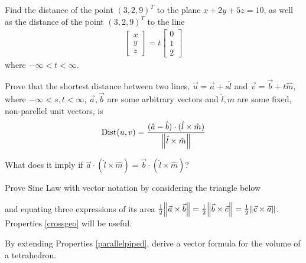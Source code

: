 \begin{Exercise}
Find the distance of the point $(3,2,9)^T$ to the plane $x + 2y + 5z = 10$, as well as the distance of the point $(3,2,9)^T$ to the line 
\begin{align*}
\begin{bmatrix}
x\\
y\\
z
\end{bmatrix}
=
t
\begin{bmatrix}
0\\
1\\
2
\end{bmatrix}
\end{align*}
where $-\infty < t < \infty$.
\end{Exercise}

\begin{Exercise}
Prove that the shortest distance between two lines, $\vec{u} = \vec{a} + s\hat{l}$ and $\vec{v} = \vec{b} + t\hat{m}$, where $-\infty < s,t < \infty$, $\vec{a}, \vec{b}$ are some arbitrary vectors and $\hat{l}, \hat{m}$ are some fixed, non-parellel unit vectors, is
\begin{align*}
\text{Dist}(u, v) = \frac{(\hat{a}-\hat{b}) \cdot (\hat{l} \times \hat{m})}{\norm{\hat{l} \times \hat{m}}}
\end{align*}
\end{Exercise}
What does it imply if $\vec{a} \cdot (\hat{l} \times \hat{m}) = \vec{b} \cdot (\hat{l} \times \hat{m})$?

\begin{Exercise}
Prove Sine Law with vector notation by considering the triangle below
\begin{center}
\end{center}
and equating three expressions of its area $\frac{1}{2}\norm{\vec{a}\times\vec{b}} = \frac{1}{2}\norm{\vec{b}\times\vec{c}} = \frac{1}{2}\norm{\vec{c}\times\vec{a}}$. Properties \ref{crossgeo} will be useful.
\end{Exercise}

\begin{Exercise}
By extending Properties \ref{parallelpiped}, derive a vector formula for the volume of a tetrahedron.
\begin{center}
\end{center}
\end{Exercise}

